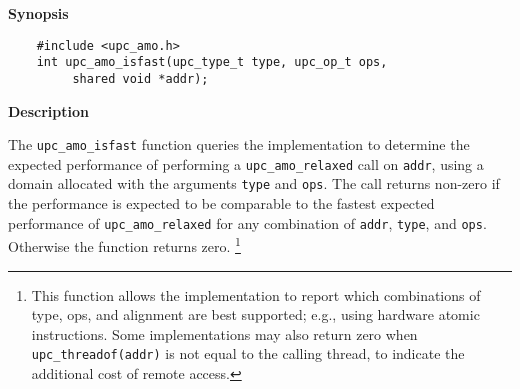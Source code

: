 {\bf Synopsis}

\npf\vspace{-1.8em}
\begin{verbatim}
    #include <upc_amo.h>
    int upc_amo_isfast(upc_type_t type, upc_op_t ops,
         shared void *addr);
\end{verbatim}

{\bf Description}

\np The {\tt upc\_amo\_isfast} function queries the implementation to determine
    the expected performance of performing a {\tt upc\_amo\_relaxed} call on
    {\tt addr}, using a domain allocated with the arguments {\tt type} and
    {\tt ops}.  The call returns non-zero if the performance is expected to be
    comparable to the fastest expected performance of {\tt upc\_amo\_relaxed}
    for any combination of {\tt addr}, {\tt type}, and {\tt ops}.  Otherwise
    the function returns zero.%
    \footnote{This function allows the implementation to report which
    combinations of type, ops, and alignment are best supported; e.g., using
    hardware atomic instructions.  Some implementations may also return zero
    when {\tt upc\_threadof(addr)} is not equal to the calling thread, to
    indicate the additional cost of remote access.}
